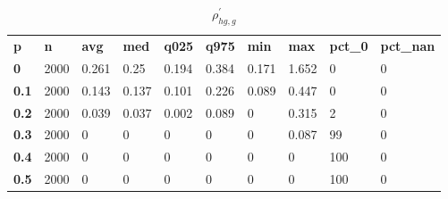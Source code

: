 \begin{table}[h]
 \centering 
\footnotesize
\caption{$\rho_{hg,g}^\prime $}
\label{tab:alphahgg}
\begin{tabular}[h]{| l l l l l l l l l l|
    } \hline
\textbf{ p} & \textbf{ n} & \textbf{ avg} & \textbf{ med} & \textbf{ q025} & \textbf{ q975} & \textbf{ min} & \textbf{ max} & \textbf{ pct\_0} & \textbf{ pct\_nan}
           \\
  \textbf{  0} & 2000 & 0.261 &  0.25 & 0.194 & 0.384 & 0.171 & 1.652 &   0 & 0
           \\
  \textbf{0.1} & 2000 & 0.143 & 0.137 & 0.101 & 0.226 & 0.089 & 0.447 &   0 & 0
           \\
  \textbf{0.2} & 2000 & 0.039 & 0.037 & 0.002 & 0.089 &     0 & 0.315 &   2 & 0
           \\
  \textbf{0.3} & 2000 &     0 &     0 &     0 &     0 &     0 & 0.087 &  99 & 0
           \\
  \textbf{0.4} & 2000 &     0 &     0 &     0 &     0 &     0 &     0 & 100 & 0
           \\
  \textbf{0.5} & 2000 &     0 &     0 &     0 &     0 &     0 &     0 & 100 & 0
           \\
 \hline \end{tabular}
 \end{table}
